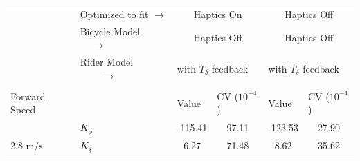 \begin{table}[]
    \begin{tabular}{llcccc}
    \hline
                                                   & Optimized to fit  $\rightarrow$                                  & \multicolumn{2}{c}{Haptics On}                                                                     & \multicolumn{2}{c}{Haptics Off}                                                                    \\ \cline{2-6} 
                                                   & Bicycle Model $\;\;\;\;\rightarrow$                              & \multicolumn{2}{c}{Haptics Off}                                                                    & \multicolumn{2}{c}{Haptics Off}                                                                    \\ \cline{2-6} 
                                                   & {\color[HTML]{333333} Rider Model $\;\;\;\;\;\;\;\;\rightarrow$} & \multicolumn{2}{l}{with $T_\delta$ feedback}                                                       & \multicolumn{2}{l}{with $T_\delta$ feedback}                                                       \\ \cline{2-6} 
                                                   &                                                                  & \multicolumn{1}{l}{}                        & \multicolumn{1}{l}{}                                 & \multicolumn{1}{l}{}                        & \multicolumn{1}{l}{}                                 \\
    \multirow{-2}{*}{Forward Speed}                &                                                                  & \multicolumn{1}{l}{\multirow{-2}{*}{Value}} & \multicolumn{1}{l}{\multirow{-2}{*}{CV ($10^{-4}$)}} & \multicolumn{1}{l}{\multirow{-2}{*}{Value}} & \multicolumn{1}{l}{\multirow{-2}{*}{CV ($10^{-4}$)}} \\ \hline
                                                   & $K_{\dot{\phi}} $                                                & -115.41                                     & 97.11                                                & -123.53                                     & 27.90                                                \\
    \multirow{-2}{*}{2.8 $\si{\meter\per\second}$} & $K_{\dot{\delta}}$                                               & 6.27                                        & 71.48                                                & 8.62                                        & 35.62                                                \\

\end{tabular}
\end{table}

